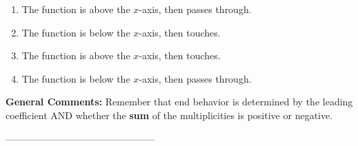 \documentclass{extbook}[14pt]
\begin{document}
\begin{enumerate}[label=\Alph*.] 
\item The function is above the $x$-axis, then passes through.  
\item The function is below the $x$-axis, then touches.  
\item The function is above the $x$-axis, then touches.  
\item The function is below the $x$-axis, then passes through.  
\end{enumerate} 
 
\textbf{General Comments:} Remember that end behavior is determined by the leading coefficient AND whether the \textbf{sum} of the multiplicities is positive or negative.

-----------------------------------------------
\end{document}
